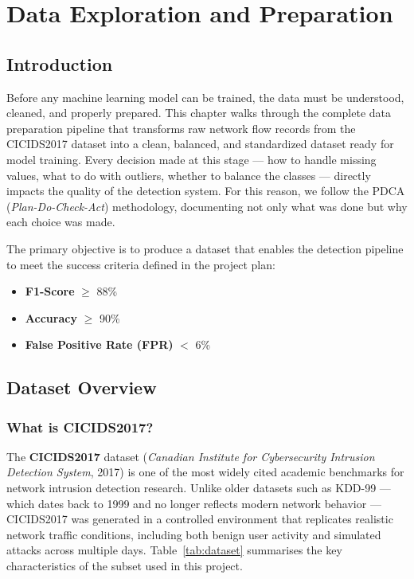 
\chapter{Data Exploration and Preparation}\label{ch:data_prep}

\section{Introduction}

Before any machine learning model can be trained, the data must be understood, cleaned, and properly prepared. This chapter walks through the complete data preparation pipeline that transforms raw network flow records from the CICIDS2017 dataset into a clean, balanced, and standardized dataset ready for model training. Every decision made at this stage --- how to handle missing values, what to do with outliers, whether to balance the classes --- directly impacts the quality of the detection system. For this reason, we follow the PDCA (\textit{Plan-Do-Check-Act}) methodology, documenting not only what was done but why each choice was made.

The primary objective is to produce a dataset that enables the detection pipeline to meet the success criteria defined in the project plan:
\begin{itemize}
    \item \textbf{F1-Score} $\geq$ 88\%
    \item \textbf{Accuracy} $\geq$ 90\%
    \item \textbf{False Positive Rate (FPR)} $<$ 6\%
\end{itemize}

\section{Dataset Overview}

\subsection{What is CICIDS2017?}

The \textbf{CICIDS2017} dataset (\textit{Canadian Institute for Cybersecurity Intrusion Detection System}, 2017) is one of the most widely cited academic benchmarks for network intrusion detection research. Unlike older datasets such as KDD-99 --- which dates back to 1999 and no longer reflects modern network behavior --- CICIDS2017 was generated in a controlled environment that replicates realistic network traffic conditions, including both benign user activity and simulated attacks across multiple days. Table~\ref{tab:dataset} summarises the key characteristics of the subset used in this project.

